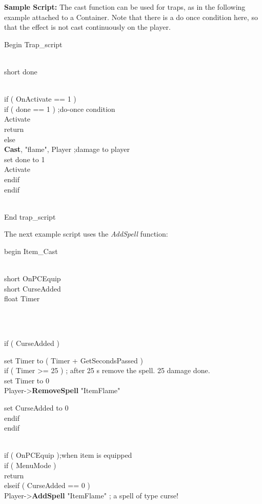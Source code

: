 \documentclass[
]{article}
\begin{document}
\textbf{Sample Script:} The cast function can be used for traps, as in
the following example attached to a Container. Note that there is a do
once condition here, so that the effect is not cast continuously on the
player.

Begin Trap\_script\\
\strut \\
short done\\
\strut \\
if ( OnActivate == 1 )\\
if ( done == 1 ) ;do-once condition\\
Activate\\
return\\
else\\
\textbf{Cast}, "flame", Player ;damage to player\\
set done to 1\\
Activate\\
endif\\
endif\\
\strut \\
End trap\_script

The next example script uses the \emph{AddSpell} function:

begin Item\_Cast\\
\strut \\
short OnPCEquip\\
short CurseAdded\\
float Timer\\
\strut \\
\strut \\
if ( CurseAdded )

set Timer to ( Timer + GetSecondsPassed )\\
if ( Timer \textgreater= 25 ) ; after 25 s remove the spell. 25 damage
done.\\
set Timer to 0\\
Player-\textgreater{}\textbf{RemoveSpell} "ItemFlame"

set CurseAdded to 0\\
endif\\
endif\\
\strut \\
if ( OnPCEquip );when item is equipped\\
if ( MenuMode )\\
return\\
elseif ( CurseAdded == 0 )\\
Player-\textgreater{}\textbf{AddSpell} "ItemFlame" ; a spell of type
curse!
\end{document}
